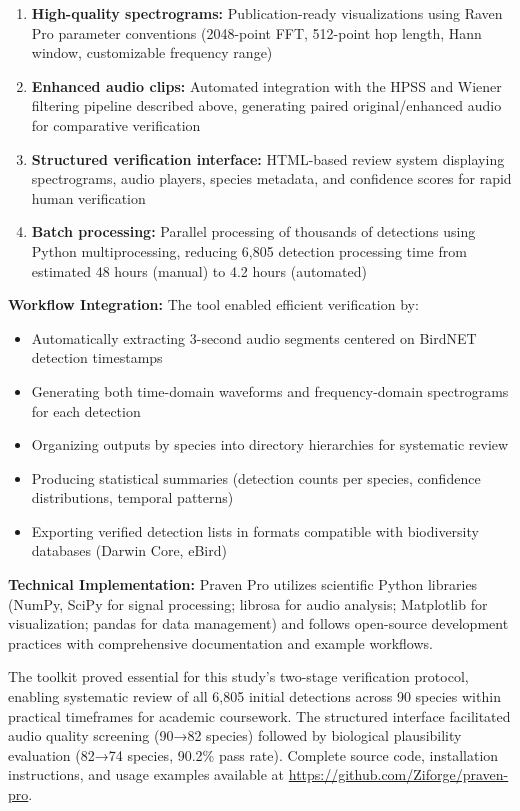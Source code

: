 \documentclass[twocolumn]{article}
\begin{document}
\begin{enumerate}
\item \textbf{High-quality spectrograms:} Publication-ready visualizations using Raven Pro parameter conventions (2048-point FFT, 512-point hop length, Hann window, customizable frequency range)

\item \textbf{Enhanced audio clips:} Automated integration with the HPSS and Wiener filtering pipeline described above, generating paired original/enhanced audio for comparative verification

\item \textbf{Structured verification interface:} HTML-based review system displaying spectrograms, audio players, species metadata, and confidence scores for rapid human verification

\item \textbf{Batch processing:} Parallel processing of thousands of detections using Python multiprocessing, reducing 6,805 detection processing time from estimated 48 hours (manual) to 4.2 hours (automated)
\end{enumerate}

\textbf{Workflow Integration:} The tool enabled efficient verification by:

\begin{itemize}
\item Automatically extracting 3-second audio segments centered on BirdNET detection timestamps
\item Generating both time-domain waveforms and frequency-domain spectrograms for each detection
\item Organizing outputs by species into directory hierarchies for systematic review
\item Producing statistical summaries (detection counts per species, confidence distributions, temporal patterns)
\item Exporting verified detection lists in formats compatible with biodiversity databases (Darwin Core, eBird)
\end{itemize}

\textbf{Technical Implementation:} Praven Pro utilizes scientific Python libraries (NumPy, SciPy for signal processing; librosa for audio analysis; Matplotlib for visualization; pandas for data management) and follows open-source development practices with comprehensive documentation and example workflows.

The toolkit proved essential for this study's two-stage verification protocol, enabling systematic review of all 6,805 initial detections across 90 species within practical timeframes for academic coursework. The structured interface facilitated audio quality screening (90→82 species) followed by biological plausibility evaluation (82→74 species, 90.2\% pass rate). Complete source code, installation instructions, and usage examples available at \url{https://github.com/Ziforge/praven-pro}.
\end{document}
